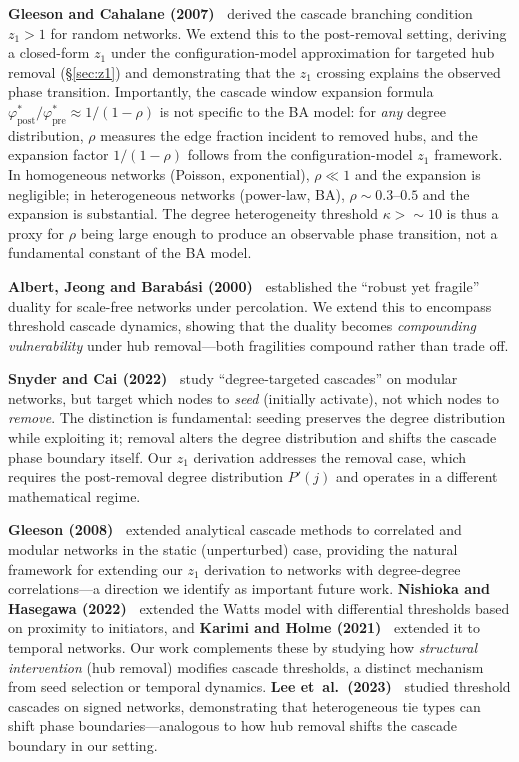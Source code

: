 \documentclass[aps,pre,twocolumn,superscriptaddress,showpacs]{revtex4-2}
\begin{document}
\textbf{Gleeson and Cahalane (2007)~\cite{Gleeson2007}} derived the cascade branching condition $z_1 > 1$ for random networks. We extend this to the post-removal setting, deriving a closed-form $z_1$ under the configuration-model approximation for targeted hub removal (\S\ref{sec:z1}) and demonstrating that the $z_1$ crossing explains the observed phase transition. Importantly, the cascade window expansion formula $\varphi^*_{\mathrm{post}}/\varphi^*_{\mathrm{pre}} \approx 1/(1-\rho)$ is not specific to the BA model: for \emph{any} degree distribution, $\rho$ measures the edge fraction incident to removed hubs, and the expansion factor $1/(1-\rho)$ follows from the configuration-model $z_1$ framework. In homogeneous networks (Poisson, exponential), $\rho \ll 1$ and the expansion is negligible; in heterogeneous networks (power-law, BA), $\rho \sim 0.3$--$0.5$ and the expansion is substantial. The degree heterogeneity threshold $\kappa > {\sim}10$ is thus a proxy for $\rho$ being large enough to produce an observable phase transition, not a fundamental constant of the BA model.

\textbf{Albert, Jeong and Barab\'asi (2000)~\cite{Albert2000}} established the ``robust yet fragile'' duality for scale-free networks under percolation. We extend this to encompass threshold cascade dynamics, showing that the duality becomes \emph{compounding vulnerability} under hub removal---both fragilities compound rather than trade off.

\textbf{Snyder and Cai (2022)~\cite{SnyderCai2022}} study ``degree-targeted cascades'' on modular networks, but target which nodes to \emph{seed} (initially activate), not which nodes to \emph{remove}. The distinction is fundamental: seeding preserves the degree distribution while exploiting it; removal alters the degree distribution and shifts the cascade phase boundary itself. Our $z_1$ derivation addresses the removal case, which requires the post-removal degree distribution $P'(j)$ and operates in a different mathematical regime.

\textbf{Gleeson (2008)~\cite{Gleeson2008}} extended analytical cascade methods to correlated and modular networks in the static (unperturbed) case, providing the natural framework for extending our $z_1$ derivation to networks with degree-degree correlations---a direction we identify as important future work. \textbf{Nishioka and Hasegawa (2022)~\cite{Nishioka2022}} extended the Watts model with differential thresholds based on proximity to initiators, and \textbf{Karimi and Holme (2021)~\cite{Karimi2021}} extended it to temporal networks. Our work complements these by studying how \emph{structural intervention} (hub removal) modifies cascade thresholds, a distinct mechanism from seed selection or temporal dynamics. \textbf{Lee et~al.\ (2023)~\cite{Lee2023}} studied threshold cascades on signed networks, demonstrating that heterogeneous tie types can shift phase boundaries---analogous to how hub removal shifts the cascade boundary in our setting.
\end{document}
